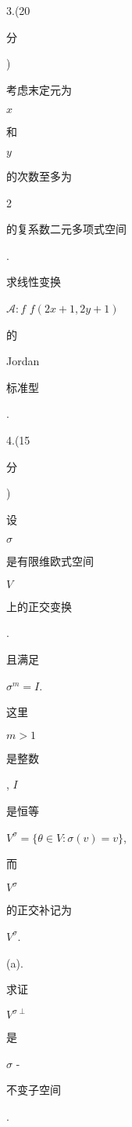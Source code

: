 \documentclass[10pt]{article}
\begin{document}
3.(20 \begin{CJK}{UTF8}{mj}分\end{CJK}) \begin{CJK}{UTF8}{mj}考虑末定元为\end{CJK} $x$ \begin{CJK}{UTF8}{mj}和\end{CJK} $y$ \begin{CJK}{UTF8}{mj}的次数至多为\end{CJK} 2 \begin{CJK}{UTF8}{mj}的复系数二元多项式空间\end{CJK}. \begin{CJK}{UTF8}{mj}求线性变换\end{CJK} $\mathscr{A}: f$ $f(2 x+1,2 y+1)$ \begin{CJK}{UTF8}{mj}的\end{CJK} Jordan \begin{CJK}{UTF8}{mj}标准型\end{CJK}.

4.(15 \begin{CJK}{UTF8}{mj}分\end{CJK}) \begin{CJK}{UTF8}{mj}设\end{CJK} $\sigma$ \begin{CJK}{UTF8}{mj}是有限维欧式空间\end{CJK} $V$ \begin{CJK}{UTF8}{mj}上的正交变换\end{CJK}. \begin{CJK}{UTF8}{mj}且满足\end{CJK} $\sigma^{m}=I$. \begin{CJK}{UTF8}{mj}这里\end{CJK} $m>1$ \begin{CJK}{UTF8}{mj}是整数\end{CJK}, $I$ \begin{CJK}{UTF8}{mj}是恒等\end{CJK} $V^{\sigma}=\{\theta \in V: \sigma(v)=v\}$, \begin{CJK}{UTF8}{mj}而\end{CJK} $V^{\sigma}$ \begin{CJK}{UTF8}{mj}的正交补记为\end{CJK} $V^{\sigma}$.

(a). \begin{CJK}{UTF8}{mj}求证\end{CJK} $V^{\sigma \perp}$ \begin{CJK}{UTF8}{mj}是\end{CJK} $\sigma$ - \begin{CJK}{UTF8}{mj}不变子空间\end{CJK}.
\end{document}
